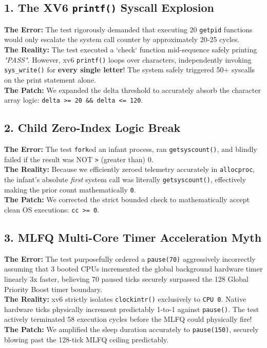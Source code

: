 \documentclass[11pt]{article}
\begin{document}
\subsection{1. The XV6 \texttt{printf()} Syscall Explosion}
\textbf{The Error:} The test rigorously demanded that executing 20 \texttt{getpid} functions would only escalate the system call counter by approximately 20-25 cycles.\\
\textbf{The Reality:} The test executed a `check` function mid-sequence safely printing \textit{"PASS"}. However, xv6 \texttt{printf()} loops over characters, independently invoking \texttt{sys\_write()} for \textbf{every single letter}! The system safely triggered 50+ syscalls on the print statement alone.\\
\textbf{The Patch:} We expanded the delta threshold to accurately absorb the character array logic: \texttt{delta >= 20 \&\& delta <= 120}.

\subsection{2. Child Zero-Index Logic Break}
\textbf{The Error:} The test \texttt{fork}ed an infant process, ran \texttt{getsyscount()}, and blindly failed if the result was NOT \texttt{>} (greater than) 0.\\
\textbf{The Reality:} Because we efficiently zeroed telemetry accurately in \texttt{allocproc}, the infant's absolute \textit{first} system call was literally \texttt{getsyscount()}, effectively making the prior count mathematically \texttt{0}.\\
\textbf{The Patch:} We corrected the strict bounded check to mathematically accept clean OS executions: \texttt{cc >= 0}.

\subsection{3. MLFQ Multi-Core Timer Acceleration Myth}
\textbf{The Error:} The test purposefully ordered a \texttt{pause(70)} aggressively incorrectly assuming that 3 booted CPUs incremented the global background hardware timer linearly 3x faster, believing 70 paused ticks securely surpassed the 128 Global Priority Boost timer boundary.\\
\textbf{The Reality:} xv6 strictly isolates \texttt{clockintr()} exclusively to \texttt{CPU 0}. Native hardware ticks physically increment predictably 1-to-1 against \texttt{pause()}. The test actively terminated 58 execution cycles before the MLFQ could physically fire!\\
\textbf{The Patch:} We amplified the sleep duration accurately to \texttt{pause(150)}, securely blowing past the 128-tick MLFQ ceiling predictably.
\end{document}
